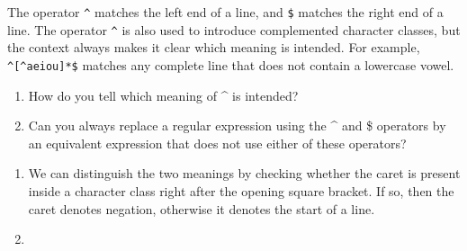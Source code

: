 \begin{exercise}\label{ex:030310}
    The operator \texttt{\^{}} matches the left end of a line, and \texttt{\$} 
    matches the right end of a line. The operator \texttt{\^{}} is also used to 
    introduce complemented character classes, but the context always makes it 
    clear which meaning is intended. For example, \texttt{\^{}[\^{}aeiou]*\$} 
    matches any complete line that does not contain a lowercase vowel.
    \begin{enumerate}[label=\alph*)]
        \item How do you tell which meaning of \^{} is intended?
        \item Can you always replace a regular expression using the \^{} and \$ 
        operators by an equivalent expression that does not use either of these 
        operators?
    \end{enumerate}
\end{exercise}
\begin{solution}\label{sol:030310}
    \begin{enumerate}[label=\alph*)]
        \item We can distinguish the two meanings by checking whether the caret 
        is present inside a character class right after the opening square bracket.
        If so, then the caret denotes negation, otherwise it denotes the start of a 
        line.
        \item 
    \end{enumerate}
\end{solution}